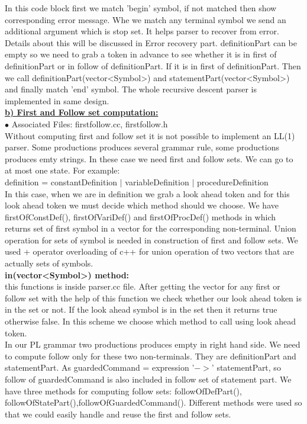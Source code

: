 \documentclass[paper=letter, fontsize=12pt]{scrartcl} %
\begin{document}
In this code block first we match 'begin' symbol, if not matched then show corresponding error message. Whe we match any terminal symbol we send an additional argument which is stop set. It helps parser to recover from error. Details about this will be discussed in Error recovery part. definitionPart can be empty so we need to grab a token in advance to see whether it is in first of definitionPart or in follow of definitionPart. If it is in first of definitionPart. Then we call definitionPart(vector<Symbol>) and statementPart(vector<Symbol>) and finally match 'end' symbol. The whole recursive descent parser is implemented in same design. \\

\underline {\bf b) First and Follow set computation:}\\

$\bullet$ Associated Files: firstfollow.cc, firstfollow.h\\

Without computing first and follow set it is not possible to implement an LL(1) parser. Some productions produces several grammar rule, some productions produces emty strings. In these case we need first and follow sets. We can go to at most one state. For example:\\

definition = constantDefinition $\mid$ variableDefinition $\mid$ procedureDefinition\\

In this case, when we are in definition we grab a look ahead token and for this look ahead token we must decide which method should we choose. We have firstOfConstDef(), firstOfVariDef() and firstOfProcDef() methods in which returns set of first symbol in a vector for the corresponding non-terminal. Union operation for sets of symbol is needed in construction of first and follow sets. We used + operator overloading of c++ for union operation of two vectors that are actually sets of symbols.\\ 

{\bf in(vector<Symbol>) method:}\\ this functions is inside parser.cc file. After getting the vector for any first or follow set with the help of this function we check whether our look ahead token is in the set or not. If the look ahead symbol is in the set then it returns true otherwise false. In this scheme we choose which method to call using look ahead token.\\

In our PL grammar two productions produces empty in right hand side. We need to compute follow only for these two non-terminals. They are definitionPart and statementPart. As guardedCommand = expression '$->$' statementPart, so follow of guardedCommand is also included in follow set of statement part. We have three methods for computing follow sets:  followOfDefPart(), followOfStatePart(),followOfGuardedCommand().  Different methods were used so that we could easily handle and reuse the first and follow sets.\\
\end{document}
